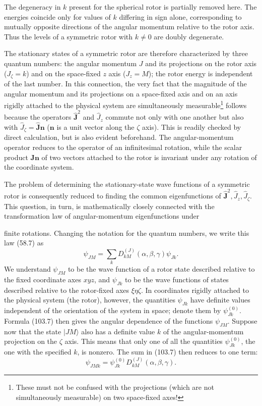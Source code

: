 The degeneracy in $k$ present for the spherical rotor is partially removed here. The energies coincide only for values of $k$ differing in sign alone, corresponding to mutually opposite directions of the angular momentum relative to the rotor axis. Thus the levels of a symmetric rotor with $k\ne0$ are doubly degenerate.

The stationary states of a symmetric rotor are therefore characterized by three quantum numbers: the angular momentum $J$ and its projections on the rotor axis ($J_\zeta=k$) and on the space-fixed $z$ axis ($J_z=M$); the rotor energy is independent of the last number. In this connection, the very fact that the magnitude of the angular momentum and its projections on a space-fixed axis and on an axis rigidly attached to the physical system are simultaneously measurable\footnote{These must not be confused with the projections (which are not simultaneously measurable) on two space-fixed axes!} follows because the operators $\hat{\mathbf J}^{2}$ and $\hat J_z$ commute not only with one another but also with $\hat J_\zeta=\hat{\mathbf J}\mathbf n$ ($\mathbf n$ is a unit vector along the $\zeta$ axis). This is readily checked by direct calculation, but is also evident beforehand. The angular-momentum operator reduces to the operator of an infinitesimal rotation, while the scalar product $\mathbf J\mathbf n$ of two vectors attached to the rotor is invariant under any rotation of the coordinate system.

The problem of determining the stationary-state wave functions of a symmetric rotor is consequently reduced to finding the common eigenfunctions of $\hat{\mathbf J}^{2},\hat J_z,\hat J_\zeta$. This question, in turn, is mathematically closely connected with the transformation law of angular-momentum eigenfunctions under

finite rotations. Changing the notation for the quantum numbers, we write this law (58.7) as
\begin{equation}
 \psi_{JM}=\sum_k D_{kM}^{(J)}(\alpha,\beta,\gamma)\psi_{Jk}. \tag{103.7}
\end{equation}
We understand $\psi_{JM}$ to be the wave function of a rotor state described relative to the fixed coordinate axes $xyz$, and $\psi_{Jk}$ to be the wave functions of states described relative to the rotor-fixed axes $\xi\eta\zeta$. In coordinates rigidly attached to the physical system (the rotor), however, the quantities $\psi_{Jk}$ have definite values independent of the orientation of the system in space; denote them by $\psi_{Jk}^{(0)}$. Formula (103.7) then gives the angular dependence of the functions $\psi_{JM}$. Suppose now that the state $|JM\rangle$ also has a definite value $k$ of the angular-momentum projection on the $\zeta$ axis. This means that only one of all the quantities $\psi_{Jk}^{(0)}$, the one with the specified $k$, is nonzero. The sum in (103.7) then reduces to one term:
\[
 \psi_{JMk}=\psi_{Jk}^{(0)}D_{kM}^{(J)}(\alpha,\beta,\gamma).
\]

